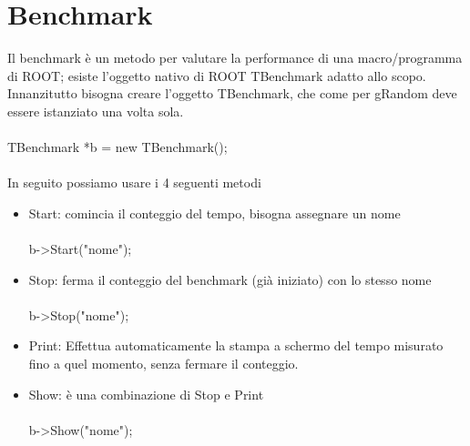 \documentclass[10pt,a4paper]{article}
\begin{document}
\section{Benchmark}
Il benchmark è un metodo per valutare la performance di una macro/programma di ROOT; esiste l'oggetto nativo di ROOT TBenchmark adatto allo scopo.\\
Innanzitutto bisogna creare l'oggetto TBenchmark, che come per gRandom deve essere istanziato una volta sola.\\\\
TBenchmark *b = new TBenchmark();\\\\
In seguito possiamo usare i 4 seguenti metodi
\begin{itemize}
	\item Start: comincia il conteggio del tempo, bisogna assegnare un nome\\\\
		b->Start("nome");\\
	\item Stop: ferma il conteggio del benchmark (già iniziato) con lo stesso nome\\\\
		b->Stop("nome");\\
	\item Print: Effettua automaticamente la stampa a schermo del tempo misurato fino a quel momento, senza fermare il conteggio.
	\item Show: è una combinazione di Stop e Print\\\\
		b->Show("nome");
\end{itemize}
\newpage
\end{document}
